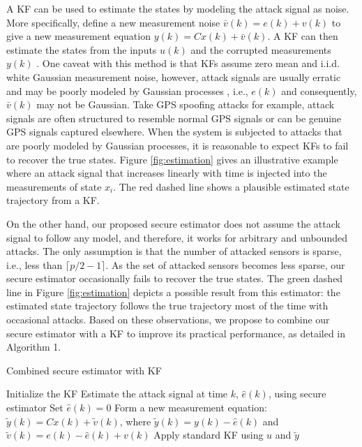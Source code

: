 \documentclass[../../thesis.tex]{subfiles}
\newcommand{\norm}[1]{\left\lVert#1\right\rVert}
\begin{document}
A KF can be used to estimate the states by modeling the attack signal as noise. More specifically, define a new measurement noise $\bar{v}(k) = e(k) + v(k)$ to give a new measurement equation $y(k) = C x(k) + \bar{v}(k)$. A KF can then estimate the states from the inputs $u(k)$ and the corrupted measurements $y(k)$ \cite{KwonACC}. 
One caveat with this method is that KFs assume zero mean and i.i.d. white Gaussian measurement noise, however, attack signals are usually erratic and may be poorly modeled by Gaussian processes \cite{KwonACC}, i.e., $e(k)$ and consequently, $\bar v(k)$ may not be Gaussian. Take GPS spoofing attacks for example, attack signals are often structured to resemble normal GPS signals or can be genuine GPS signals captured elsewhere.  
When the system is subjected to attacks that are poorly modeled by Gaussian processes, it is reasonable to expect KFs to fail to recover the true states. 
Figure \ref{fig:estimation} gives an illustrative example where an attack signal that increases linearly with time is injected into the measurements of state $x_i$. The red dashed line shows a plausible estimated state trajectory from a KF.

On the other hand, our proposed secure estimator does not assume the attack signal to follow any model, and therefore, it works for arbitrary and unbounded attacks. 
The only assumption is that the number of attacked sensors is sparse, i.e., less than $\lceil p/2-1\rceil$. 
As the set of attacked sensors becomes less sparse, our secure estimator occasionally fails to recover the true states.
The green dashed line in Figure \ref{fig:estimation} depicts a possible result from this estimator: the estimated state trajectory follows the true trajectory most of the time with occasional attacks. 
Based on these observations, we propose to combine our secure estimator with a KF to improve its practical performance, as detailed in Algorithm 1.
\begin{algorithm}
\caption{Combined secure estimator with KF}
\label{al:se_kf}
\begin{algorithmic}[1]
\State Initialize the KF
		\State Estimate the attack signal at time $k$, $\hat e(k)$, using secure estimator
	\Else
		\State Set $\hat e(k) = 0$
	\EndIf
	\State Form a new measurement equation: $\tilde y(k) =  C x(k) + \tilde v(k)$, where $\tilde y(k) = y(k) - \hat e(k)$ and $ \tilde v(k) = e (k) - \hat e(k) + v(k)$
	\State Apply standard KF using $u$ and $\tilde y$ 
\EndFor
\end{algorithmic}
\end{algorithm}
\end{document}
